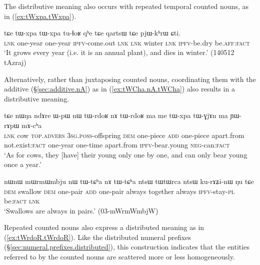 The distributive meaning also occurs with repeated temporal counted nouns, as in (\ref{ex:tWxpa.tWxpa}).

\begin{exe}
	\ex \label{ex:tWxpa.tWxpa}
	\gll tɕe tɯ-xpa tɯ-xpa tu-ɬoʁ qʰe tɕe qartsɯ tɕe pjɯ-kʰrɯ ɕti. \\
	\textsc{lnk} one-year one-year \textsc{ipfv}-come.out \textsc{lnk} \textsc{lnk} winter \textsc{lnk}  \textsc{ipfv}-be.dry be.\textsc{aff}:\textsc{fact} \\
	\glt  `It grows every year (i.e. it is an annual plant), and dies in winter.' (140512 tAzraj)
\end{exe}

Alternatively, rather than juxtaposing counted nouns, coordinating them with the additive  (§\ref{sec:additive.nA}) as in (\ref{ex:tWCha.nA.tWCha}) also results in a distributive meaning.

\begin{exe}
	\ex \label{ex:tWrdoʁ.nA.tWrdoʁ}
	\gll  tɕe nɯŋa ndɤre ɯ-pɯ nɯ tɯ-rdoʁ nɤ tɯ-rdoʁ ma me tɯ-xpa tɯ-ɣjɤn ma ɲɯ-rɤpɯ mɤ-cʰa \\
	\textsc{lnk} cow \textsc{top}.\textsc{advers} \textsc{3sg}.\textsc{poss}-offspring \textsc{dem} one-piece \textsc{add} one-piece apart.from not.exist:\textsc{fact}  one-year one-time apart.from \textsc{ipfv}-bear.young \textsc{neg}-can:\textsc{fact} \\
	\glt `As for cows, they [have] their young only one by one, and can only bear young once a year.'
\end{exe}

\begin{exe}
	\ex \label{ex:tWCha.nA.tWCha}
	\gll nɯnɯ mɯrmɯmbju nɯ tɯ-tɕʰa nɤ tɯ-tɕʰa ntsɯ tɯtɯrca ntsɯ ku-rɤʑi-nɯ ŋu tɕe \\
	\textsc{dem} swallow \textsc{dem} one-pair \textsc{add}  one-pair  always together always \textsc{ipfv}-stay-\textsc{pl} be:\textsc{fact} \textsc{lnk}  \\
	\glt `Swallows are always in pairs.' (03-mWrmWmbjW) 
\end{exe}

Repeated counted nouns also express a distributed meaning as in (\ref{ex:tWrdoR.tWrdoR}). Like the distributed numeral prefixes (§\ref{sec:numeral.prefixes.distributed}), this construction indicates that the entities referred to by the counted nouns are scattered more or less homogeneously.

